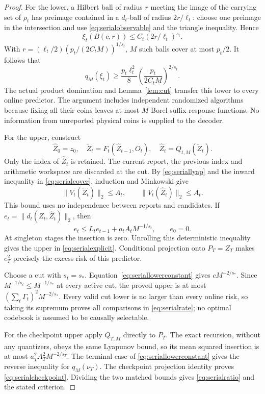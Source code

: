 \begin{proof}
For the lower, a Hilbert ball of radius $r$ meeting the image of the carrying set of $\rho_t$ has preimage contained in a $d_t$-ball of radius $2r/\ell_t$: choose one preimage in the intersection and use \eqref{eq:serialobservable} and the triangle inequality. Hence
\[
 \xi_t(B(c,r))\le C_t(2r/\ell_t)^{s_t}.
\]
With $r=(\ell_t/2)(p_t/(2C_tM))^{1/s_t}$, $M$ such balls cover at most $p_t/2$. It follows that
\begin{equation}\label{eq:seriallowerconstant}
 q_M(\xi_t)\ge \frac{p_t\ell_t^2}{8}
                 \left(\frac{p_t}{2C_tM}\right)^{2/s_t}.
\end{equation}
The actual product domination and Lemma~\ref{lem:cut} transfer this lower to every online predictor. The argument includes independent randomized algorithms because fixing all their coins leaves at most $M$ Borel suffix-response functions. No information from unreported physical coins is supplied to the decoder.

For the upper, construct
\[
 \widehat Z_0=z_0,\quad \widetilde Z_t=F_t(\widehat Z_{t-1},O_t),\quad
 \widehat Z_t=Q_{t,M}(\widetilde Z_t).
\]
Only the index of $\widehat Z_t$ is retained. The current report, the previous index and arithmetic workspace are discarded at the cut. By \eqref{eq:seriallyap} and the inward inequality in \eqref{eq:serialcover}, induction and Minkowski give
\[
 \|V_t(\widetilde Z_t)\|_2\le A_t,\qquad
 \|V_t(\widehat Z_t)\|_2\le A_t.
\]
This bound uses no independence between reports and candidates. If
$e_t=\|d_t(Z_t,\widehat Z_t)\|_2$, then
\[
 e_t\le L_t e_{t-1}+a_tA_tM^{-1/s_t},\qquad e_0=0.
\]
At singleton stages the insertion is zero. Unrolling this deterministic inequality gives the upper in \eqref{eq:serialexplicit}. Conditional projection onto $P_T=Z_T$ makes $e_T^2$ precisely the excess risk of this predictor.

Choose a cut with $s_t=s_*$. Equation~\eqref{eq:seriallowerconstant} gives $cM^{-2/s_*}$. Since $M^{-1/s_t}\le M^{-1/s_*}$ at every active cut, the proved upper is at most $(\sum_t\Gamma_t)^2M^{-2/s_*}$. Every valid cut lower is no larger than every online risk, so taking its supremum proves all comparisons in \eqref{eq:serialrate}; no optimal codebook is assumed to be causally selectable.

For the checkpoint upper apply $Q_{T,M}$ directly to $P_T$. The exact recursion, without any quantizers, obeys the same Lyapunov bound, so its mean squared insertion is at most $a_T^2A_T^2M^{-2/s_T}$. The terminal case of \eqref{eq:seriallowerconstant} gives the reverse inequality for $q_M(\nu_T)$. The checkpoint projection identity proves \eqref{eq:serialcheckpoint}. Dividing the two matched bounds gives \eqref{eq:serialratio} and the stated criterion.
\end{proof}

